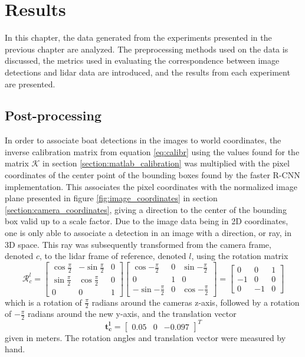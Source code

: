 
\chapter{Results}
In this chapter, the data generated from the experiments presented in the previous chapter are analyzed. The preprocessing methods used on the data is discussed, the metrics used in evaluating the correspondence between image detections and lidar data are introduced, and the results from each experiment are presented.
\section{Post-processing}
In order to associate boat detections in the images to world coordinates, the inverse calibration matrix from equation \ref{eq:calibr} using the values found for the matrix $\mathcal{K}$ in section \ref{section:matlab_calibration} was multiplied with the pixel coordinates of the center point of the bounding boxes found by the faster R-CNN implementation. This associates the pixel coordinates with the normalized image plane presented in figure \ref{fig:image_coordinates} in section \ref{section:camera_coordinates}, giving a direction to the center of the bounding box valid up to a scale factor. Due to the image data being in 2D coordinates, one is only able to associate a detection in an image with a direction, or ray, in 3D space. This ray was subsequently transformed from the camera frame, denoted $c$, to the lidar frame of reference, denoted $l$, using the rotation matrix
\begin{equation}
\mathcal{R}_c^l=\begin{bmatrix}
\cos{\frac{\pi}{2}} & -\sin{\frac{\pi}{2}} & 0 \\
\sin{\frac{\pi}{2}} & \cos{\frac{\pi}{2}} & 0 \\
0 & 0 & 1
\end{bmatrix}\begin{bmatrix}
\cos{-\frac{\pi}{2}} & 0 & \sin{-\frac{\pi}{2}}\\
0 & 1 & 0 \\
-\sin{-\frac{\pi}{2}} & 0 & \cos{-\frac{\pi}{2}}
\end{bmatrix}=\begin{bmatrix}
0 & 0 & 1\\
-1 & 0 & 0\\
0 & -1 & 0
\end{bmatrix}
\end{equation}
which is a rotation of $\frac{\pi}{2}$ radians around the cameras z-axis, followed by a rotation of $-\frac{\pi}{2}$ radians around the new y-axis, and the translation vector
\begin{equation}
\mathbf{t_c^l}=\begin{bmatrix}
0.05 & 0 & -0.097
\end{bmatrix}^T
\end{equation} 
given in meters. The rotation angles and translation vector were measured by hand.

